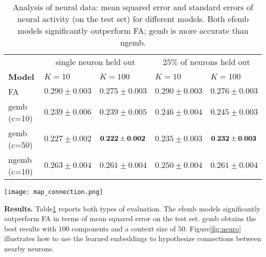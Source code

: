 \documentclass[12pt]{article}
\DeclareRobustCommand{\parhead}[1]{\vspace{0.05in} \textbf{#1} }
\begin{document}
\begin{table}[]
\centering
\small
\begin{tabular}{lllll}
\toprule
                       & \multicolumn{2}{c}{single neuron held out}   & \multicolumn{2}{c}{$25\%$ of neurons held out} \\
  {\bf Model}                & $K=10           $          &$ K=100          $ &$ K=10            $      &$ K=100           $     \\
  \hline
  \gls{FA}             & $0.290\pm 0.003 $         &$ 0.275 \pm 0.003$     &$ 0.290 \pm 0.003 $      &$ 0.276 \pm 0.003 $     \\
  \gls{gemb} (c=10)    & $0.239\pm 0.006 $         &$ 0.239\pm 0.005 $     &$ 0.246 \pm 0.004 $      &$ 0.245 \pm 0.003 $     \\
  \gls{gemb} (c=50)    & $0.227\pm 0.002 $         &$ {\bf 0.222\pm 0.002}$&$ 0.235 \pm 0.003 $      &$ {\bf 0.232 \pm 0.003} $     \\
  \gls{ngemb} (c=10)   & $0.263\pm 0.004 $         &$ 0.261\pm 0.004 $     &$ 0.250 \pm 0.004 $      &$ 0.261 \pm 0.004 $     \\
  \bottomrule
\end{tabular}
\caption{Analysis of neural data: mean squared error and standard
  errors of neural activity (on the test set) for different models.
  Both \gls{efemb} models significantly outperform \gls{FA};
  \gls{gemb} is more accurate than \gls{ngemb}.
}
\label{tab:results}
\vspace{-7pt}
\end{table}
\begin{figure*}[t]
  \centering
  {\texttt{[image: map\_connection.png]}}
  \caption{ Top view of the zebrafish brain, with blue circles at the
    location of the individual neurons. We zoom on 3 neurons and their
    $50$ nearest neighbors (small blue dots), visualizing the
    ``synaptic weights'' learned by a \gls{gemb} model ($K=100$).
    The edge color encodes the inner product of the neural embedding
    vector and the context vectors $\rho_n^\top\alpha_m$ for
    each neighbor $m$. Positive values are green, negative values are
    red, and the transparency is proportional to the magnitude. With
    these weights we can form hypotheses about how nearby neurons are
    connected. }
\label{fig:neuro}
\vspace{-5pt}
\end{figure*}

\parhead{Results.}
Table\nobreakspace \ref {tab:results} reports both types of evaluation. The \gls{efemb}
models significantly outperform \gls{FA} in terms of mean squared
error on the test set. \gls{gemb} obtains the best results with $100$
components and a context size of $50$. Figure\nobreakspace \ref {fig:neuro} illustrates
how to use the learned embeddings to hypothesize connections between
nearby neurons.
\end{document}
